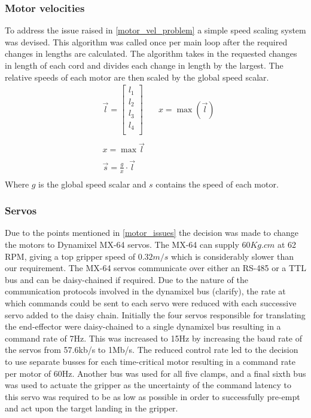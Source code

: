 \documentclass[conference]{IEEEtran}
\begin{document}
\subsubsection{Motor velocities}\label{motor_speed_section}
To address the issue raised in \ref{motor_vel_problem} a simple speed scaling system was devised. This algorithm was called once per main loop after the required changes in lengths are calculated. The algorithm takes in the requested changes in length of each cord and divides each change in length by the largest. The relative speeds of each motor are then scaled by the global speed scalar.
\begin{equation}\label{motor_speed_equation}
\begin{aligned}
&\vec{l} = \begin{bmatrix}
l_1\\l_2\\l_3\\l_4\\
\end{bmatrix}\quad
&x = \max\left(\vec{l}\right)\\\\
&x = \max\vec{l}\\\\
&\vec{s} = \frac{g}{x}\cdot \vec{l}\\
\end{aligned}
\end{equation}
Where $g$ is the global speed scalar and $s$ contains the speed of each motor.
\subsubsection{Servos}
Due to the points mentioned in \ref{motor_issues} the decision was made to change the motors to Dynamixel MX-64 servos. The MX-64 can supply $60Kg.cm$ at 62 RPM, giving a top gripper speed of $0.32m/s$ which is considerably slower than our requirement. The MX-64 servos communicate over either an RS-485 or a TTL bus and can be daisy-chained if required. Due to the nature of the communication protocols involved in the dynamixel bus (clarify), the rate at which commands could be sent to each servo were reduced with each successive servo added to the daisy chain. Initially the four servos responsible for translating the end-effector were daisy-chained to a single dynamixel bus resulting in a command rate of 7Hz. This was increased to 15Hz by increasing the baud rate of the servos from 57.6kb/s to 1Mb/s. The reduced control rate led to the decision to use separate busses for each time-critical motor resulting in a command rate per motor of 60Hz. Another bus was used for all five clamps, and a final sixth bus was used to actuate the gripper as the uncertainty of the command latency to this servo was required to be as low as possible in order to successfully pre-empt and act upon the target landing in the gripper. 
\end{document}

